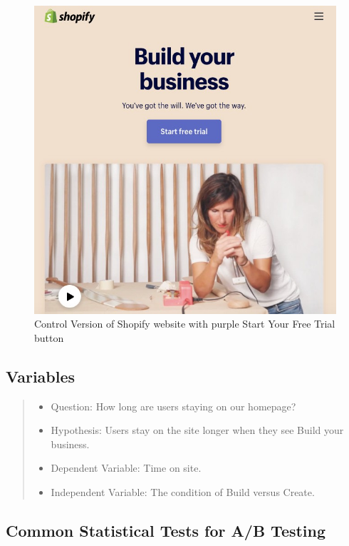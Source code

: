 \documentclass[]{article}
\providecommand{\tightlist}{%
  \setlength{\itemsep}{0pt}\setlength{\parskip}{0pt}}
\begin{document}
\begin{figure}
\centering
\includegraphics{docs/control.jpg}
\caption{Control Version of Shopify website with purple Start Your Free
Trial button}
\end{figure}

\subsection{Variables}\label{variables}

\begin{quote}
\begin{itemize}
\tightlist
\item
  Question: How long are users staying on our homepage?
\item
  Hypothesis: Users stay on the site longer when they see Build your
  business.
\item
  Dependent Variable: Time on site.
\item
  Independent Variable: The condition of Build versus Create.
\end{itemize}
\end{quote}

\subsection{Common Statistical Tests for A/B
Testing}\label{common-statistical-tests-for-ab-testing}
\end{document}
